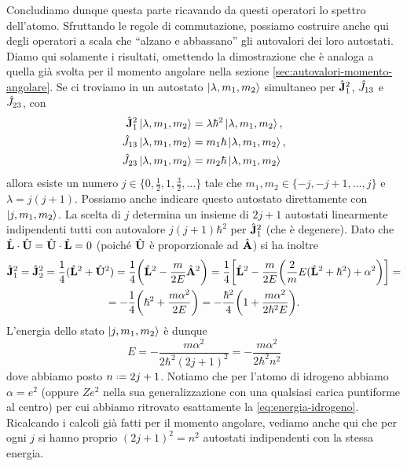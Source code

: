 Concludiamo dunque questa parte ricavando da questi operatori lo spettro dell'atomo.
Sfruttando le regole di commutazione, possiamo costruire anche qui degli operatori a scala che ``alzano e abbassano'' gli autovalori dei loro autostati.
Diamo qui solamente i risultati, omettendo la dimostrazione che è analoga a quella già svolta per il momento angolare nella sezione \ref{sec:autovalori-momento-angolare}.
Se ci troviamo in un autostato $\left|{\lambda,m_1,m_2}\right\rangle$ simultaneo per $\hat{\mathbf{J}}_1^2$, $\hat{J}_{13}$ e $\hat{J}_{23}$, con
\begin{equation}
	\begin{aligned}
		\hat{\mathbf{J}}_1^2\left|{\lambda,m_1,m_2}\right\rangle&=\lambda\hbar^2\left|{\lambda,m_1,m_2}\right\rangle,\\
		\hat{J}_{13}\left|{\lambda,m_1,m_2}\right\rangle		&=m_1\hbar\left|{\lambda,m_1,m_2}\right\rangle,\\
		\hat{J}_{23}\left|{\lambda,m_1,m_2}\right\rangle		&=m_2\hbar\left|{\lambda,m_1,m_2}\right\rangle
	\end{aligned}
\end{equation}
allora esiste un numero $j\in\big\{0,\frac12,1,\frac32,\dots\big\}$ tale che $m_1,m_2\in\{-j,-j+1,\dots,j\}$ e $\lambda=j(j+1)$.
Possiamo anche indicare questo autostato direttamente con $\left|{j,m_1,m_2}\right\rangle$.
La scelta di $j$ determina un insieme di $2j+1$ autostati linearmente indipendenti tutti con autovalore $j(j+1)\hbar^2$ per $\hat{\mathbf{J}}_1^2$ (che è degenere).
Dato che ${\hat{\mathbf{L}}}\cdot{\hat{\mathbf{U}}}={\hat{\mathbf{U}}}\cdot{\hat{\mathbf{L}}}=0$ (poich\'e $\hat{\mathbf{U}}$ è proporzionale ad $\hat{\mathbf{A}}$) si ha inoltre
\begin{multline}
	\hat{\mathbf{J}}_1^2=\hat{\mathbf{J}}_2^2=
	\frac14(\hat{\mathbf{L}}^2+\hat{\mathbf{U}}^2)=
	\frac14\bigg(\hat{\mathbf{L}}^2-\frac{m}{2E}\hat{\mathbf{A}}^2\bigg)=
	\frac14\bigg[\hat{\mathbf{L}}^2-\frac{m}{2E}\bigg(\frac2{m}E(\hat{\mathbf{L}}^2+\hbar^2)+\alpha^2\bigg)\bigg]=\\=
	-\frac14\bigg(\hbar^2+\frac{m\alpha^2}{2E}\bigg)=
	-\frac{\hbar^2}4\bigg(1+\frac{m\alpha^2}{2\hbar^2E}\bigg).
\end{multline}
L'energia dello stato $\left|{j,m_1,m_2}\right\rangle$ è dunque
\begin{equation}
	E=-\frac{m\alpha^2}{2\hbar^2(2j+1)^2}=-\frac{m\alpha^2}{2\hbar^2n^2}
\end{equation}
dove abbiamo posto $n\defeq 2j+1$.
Notiamo che per l'atomo di idrogeno abbiamo $\alpha=e^2$ (oppure $Ze^2$ nella sua generalizzazione con una qualsiasi carica puntiforme al centro) per cui abbiamo ritrovato esattamente la \eqref{eq:energia-idrogeno}.
Ricalcando i calcoli già fatti per il momento angolare, vediamo anche qui che per ogni $j$ si hanno proprio $(2j+1)^2=n^2$ autostati indipendenti con la stessa energia.

